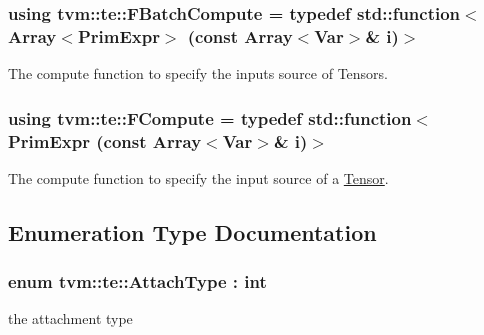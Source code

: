 \subsubsection[{\texorpdfstring{F\+Batch\+Compute}{FBatchCompute}}]{\setlength{\rightskip}{0pt plus 5cm}using {\bf tvm\+::te\+::\+F\+Batch\+Compute} = typedef std\+::function$<${\bf Array}$<${\bf Prim\+Expr}$>$ (const {\bf Array}$<${\bf Var}$>$\& i)$>$}\hypertarget{namespacetvm_1_1te_aabb227a4a0747faf17a2a8028f5430d5}{}\label{namespacetvm_1_1te_aabb227a4a0747faf17a2a8028f5430d5}


The compute function to specify the inputs source of Tensors. 

\subsubsection[{\texorpdfstring{F\+Compute}{FCompute}}]{\setlength{\rightskip}{0pt plus 5cm}using {\bf tvm\+::te\+::\+F\+Compute} = typedef std\+::function$<${\bf Prim\+Expr} (const {\bf Array}$<${\bf Var}$>$\& i)$>$}\hypertarget{namespacetvm_1_1te_a234ec7f58c22878752d476bd7e99bcea}{}\label{namespacetvm_1_1te_a234ec7f58c22878752d476bd7e99bcea}


The compute function to specify the input source of a \hyperlink{classtvm_1_1te_1_1Tensor}{Tensor}. 



\subsection{Enumeration Type Documentation}
\subsubsection[{\texorpdfstring{Attach\+Type}{AttachType}}]{\setlength{\rightskip}{0pt plus 5cm}enum {\bf tvm\+::te\+::\+Attach\+Type} \+: int}\hypertarget{namespacetvm_1_1te_a7693a274748dadfa2eaa35f5ce9008a5}{}\label{namespacetvm_1_1te_a7693a274748dadfa2eaa35f5ce9008a5}


the attachment type 

